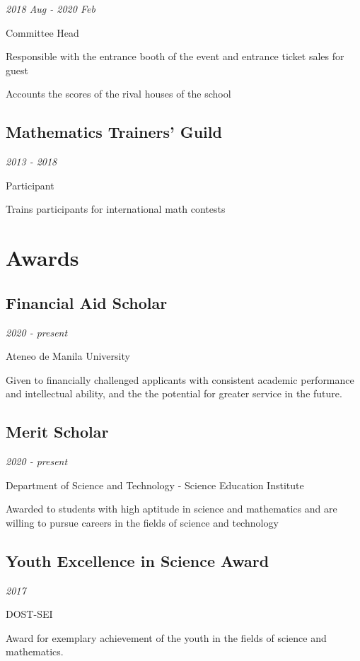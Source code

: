\documentclass[a4paper, 9pt]{article}
\begin{document}
\hfill {\itshape 2018 Aug - 2020 Feb}

Committee Head

\hspace{1em} Responsible with the entrance booth of the event and entrance ticket sales for guest

\hspace{1em} Accounts the scores of the rival houses of the school

\subsection{Mathematics Trainers' Guild}

\hfill {\itshape 2013 - 2018}

Participant

\hspace{1em} Trains participants for international math contests

\section{Awards}

\subsection{Financial Aid Scholar}

\hfill {\itshape 2020 - present}

Ateneo de Manila University

\begin{adjustwidth}{3em}{}

Given to financially challenged applicants with consistent academic performance and intellectual ability, and the the potential for greater service in the future.

\end{adjustwidth}

\subsection{Merit Scholar}

\hfill {\itshape 2020 - present}

Department of Science and Technology - Science Education Institute


\begin{adjustwidth}{3em}{}
Awarded to students with high aptitude in science and mathematics and are willing to pursue careers in the fields of science and technology
\end{adjustwidth}
\subsection{Youth Excellence in Science Award}

\hfill {\itshape 2017}

DOST-SEI

\hspace{1em} Award for exemplary achievement of the youth in the fields of science and mathematics.
\end{document}

